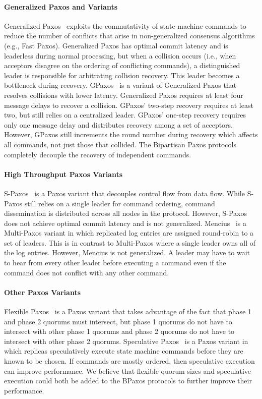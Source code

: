 \paragraph{Generalized Paxos and Variants}
Generalized Paxos~\cite{lamport2005generalized} exploits the commutativity of
state machine commands to reduce the number of conflicts that arise in
non-generalized consensus algorithms (e.g., Fast Paxos). Generalized Paxos has
optimal commit latency and is leaderless during normal processing, but when a
collision occurs (i.e., when acceptors disagree on the ordering of conflicting
commands), a distinguished leader is responsible for arbitrating collision
recovery. This leader becomes a bottleneck during recovery.
%
GPaxos~\cite{sutra2011fast} is a variant of Generalized Paxos that resolves
collisions with lower latency. Generalized Paxos requires at least four message
delays to recover a collision. GPaxos' two-step recovery requires at least two,
but still relies on a centralized leader. GPaxos' one-step recovery requires
only one message delay and distributes recovery among a set of acceptors.
However, GPaxos still increments the round number during recovery which affects
all commands, not just those that collided. The Bipartisan Paxos protocols
completely decouple the recovery of independent commands.

\paragraph{High Throughput Paxos Variants}
S-Paxos~\cite{biely2012s} is a Paxos variant that decouples control flow from
data flow. While S-Paxos still relies on a single leader for command ordering,
command dissemination is distributed across all nodes in the protocol. However,
S-Paxos does not achieve optimal commit latency and is not generalized.
%
Mencius~\cite{mao2008mencius} is a Multi-Paxos variant in which replicated log
entries are assigned round-robin to a set of leaders. This is in contrast to
Multi-Paxos where a single leader owns all of the log entries. However, Mencius
is not generalized. A leader may have to wait to hear from every other leader
before executing a command even if the command does not conflict with any other
command.

\paragraph{Other Paxos Variants}
Flexible Paxos~\cite{howard2016flexible} is a Paxos variant that takes
advantage of the fact that phase 1 and phase 2 quorums must intersect, but
phase 1 quorums do not have to intersect with other phase 1 quorums and phase 2
quorums do not have to intersect with other phase 2 quorums.
%
Speculative Paxos~\cite{ports2015designing} is a Paxos variant in which
replicas speculatively execute state machine commands before they are known to
be chosen. If commands are mostly ordered, then speculative execution can
improve performance.
%
We believe that flexible quorum sizes and speculative execution could both be
added to the BPaxos protocols to further improve their performance.
